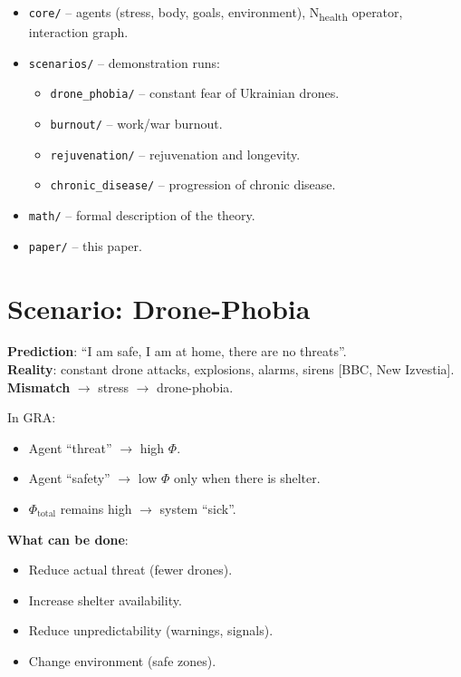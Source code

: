 \documentclass[11pt,a4paper]{article}
\begin{document}
\begin{itemize}
  \item \texttt{core/} -- agents (stress, body, goals, environment), N\textsubscript{health} operator, interaction graph.
  \item \texttt{scenarios/} -- demonstration runs:
  \begin{itemize}
    \item \texttt{drone\_phobia/} -- constant fear of Ukrainian drones.
    \item \texttt{burnout/} -- work/war burnout.
    \item \texttt{rejuvenation/} -- rejuvenation and longevity.
    \item \texttt{chronic\_disease/} -- progression of chronic disease.
  \end{itemize}
  \item \texttt{math/} -- formal description of the theory.
  \item \texttt{paper/} -- this paper.
\end{itemize}

\section{Scenario: Drone-Phobia}

\textbf{Prediction}: ``I am safe, I am at home, there are no threats''. \\
\textbf{Reality}: constant drone attacks, explosions, alarms, sirens [BBC, New Izvestia]. \\
\textbf{Mismatch} $\to$ stress $\to$ drone-phobia.

In GRA:
\begin{itemize}
  \item Agent ``threat'' $\to$ high $\Phi$.
  \item Agent ``safety'' $\to$ low $\Phi$ only when there is shelter.
  \item $\Phi_{\text{total}}$ remains high $\to$ system ``sick''.
\end{itemize}

\textbf{What can be done}:
\begin{itemize}
  \item Reduce actual threat (fewer drones).
  \item Increase shelter availability.
  \item Reduce unpredictability (warnings, signals).
  \item Change environment (safe zones).
\end{itemize}
\end{document}
